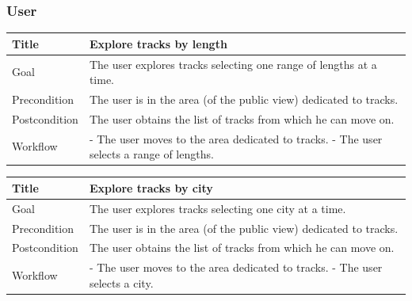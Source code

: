 \documentclass{beamer}
\begin{document}
\begin{frame}
    \frametitle{User}
    \begin{table}
        \tiny
        \begin{tabular}{|p{2cm}|p{6cm}|}
        \hline
        Title & \textbf{Explore tracks by length} \\
        \hline
        Goal & The user explores tracks selecting one range of lengths at a time. \\
        \hline
        Precondition & The user is in the area (of the public view) dedicated to tracks.\\
        \hline
        Postcondition & The user obtains the list of tracks from which he can move on.\\
        \hline
        Workflow &
        - The user moves to the area dedicated to tracks. \newline
        - The user selects a range of lengths. \\
        \hline
        \end{tabular}
\end{table}

\begin{table}
    \tiny
    \begin{tabular}{|p{2cm}|p{6cm}|}
    \hline
    Title & \textbf{Explore tracks by city} \\
    \hline
    Goal & The user explores tracks selecting one city at a time. \\
    \hline
    Precondition & The user is in the area (of the public view) dedicated to tracks.\\
    \hline
    Postcondition & The user obtains the list of tracks from which he can move on.\\
    \hline
    Workflow &
    - The user moves to the area dedicated to tracks. \newline
    - The user selects a city. \\
    \hline
    \end{tabular}
\end{table}
\end{frame}


\end{document}
